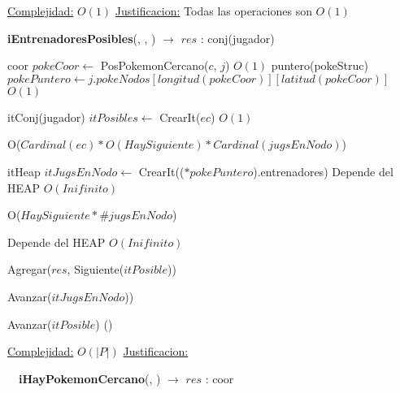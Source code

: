 \begin{Algoritmos}
\begin{algorithm}[H]
\begin{algorithmic}[1]
\medskip
\State \underline{Complejidad:} $O(1)$
\State \underline{Justificacion:} Todas las operaciones son $O(1)$


\end{algorithmic}
\end{algorithm}


\begin{algorithm}[H]
{\textbf{iEntrenadoresPosibles}(, , ) $\to$ $res$ : conj(jugador)}
\begin{algorithmic}[1]

\State coor $pokeCoor \gets$ PosPokemonCercano($c$, $j$) \Comment $O(1)$
\State puntero(pokeStruc) $pokePuntero \gets j.pokeNodos[longitud(pokeCoor)][latitud(pokeCoor)]$ \Comment $O(1)$

\State itConj(jugador) $itPosibles \gets$ CrearIt($ec$) \Comment $O(1)$

   \Comment O($Cardinal(ec) * O(HaySiguiente) * Cardinal(jugsEnNodo)$)
    
    \State itHeap $itJugsEnNodo \gets$ CrearIt(($*pokePuntero$).entrenadores)     \Comment Depende del HEAP $O(Inifinito)$
    
       \Comment O($HaySiguiente * \#jugsEnNodo$)

           \Comment Depende del HEAP $O(Inifinito)$
        
            \State Agregar($res$, Siguiente($itPosible$))
    
        \EndIf
        
        \State Avanzar($itJugsEnNodo$))
    
    \EndWhile
    
    \State Avanzar($itPosible$)   \Comment()



\EndWhile


\medskip
\State \underline{Complejidad:} $O(|P|)$
\State \underline{Justificacion:} 

\end{algorithmic}
\end{algorithm}


$ $\newline
$ $\newline
$ $\newline
{\textbf{iHayPokemonCercano}(, ) $\to$ $res$ : coor}
\begin{algorithmic}[1]


\end{algorithmic}
\end{Algoritmos}
